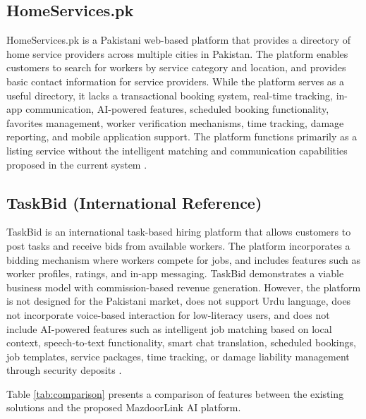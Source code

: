 \documentclass[12pt,a4paper]{report}
\begin{document}
\subsection{HomeServices.pk}
HomeServices.pk is a Pakistani web-based platform that provides a directory of home service providers across multiple cities in Pakistan. The platform enables customers to search for workers by service category and location, and provides basic contact information for service providers. While the platform serves as a useful directory, it lacks a transactional booking system, real-time tracking, in-app communication, AI-powered features, scheduled booking functionality, favorites management, worker verification mechanisms, time tracking, damage reporting, and mobile application support. The platform functions primarily as a listing service without the intelligent matching and communication capabilities proposed in the current system \cite{homeservices}.

\subsection{TaskBid (International Reference)}
TaskBid is an international task-based hiring platform that allows customers to post tasks and receive bids from available workers. The platform incorporates a bidding mechanism where workers compete for jobs, and includes features such as worker profiles, ratings, and in-app messaging. TaskBid demonstrates a viable business model with commission-based revenue generation. However, the platform is not designed for the Pakistani market, does not support Urdu language, does not incorporate voice-based interaction for low-literacy users, and does not include AI-powered features such as intelligent job matching based on local context, speech-to-text functionality, smart chat translation, scheduled bookings, job templates, service packages, time tracking, or damage liability management through security deposits \cite{taskbid}.

Table \ref{tab:comparison} presents a comparison of features between the existing solutions and the proposed MazdoorLink AI platform.
\end{document}
